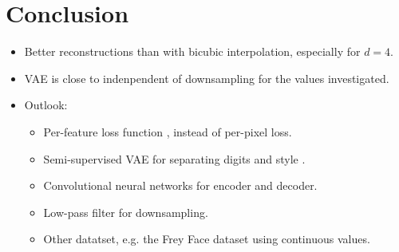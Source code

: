 \section{Conclusion} \label{sec:conclusion}

\begin{itemize}
	\item Better reconstructions than with bicubic interpolation, especially for $d = 4$.
	\item VAE is close to indenpendent of downsampling for the values investigated.
	\item Outlook:
	\begin{itemize}
		\item Per-feature loss function \cite{Johnson16}, instead of per-pixel loss.
		\item Semi-supervised VAE for separating digits and style \cite{Kingma2014}.
		\item Convolutional neural networks for encoder and decoder.
		\item Low-pass filter for downsampling.
		\item Other datatset, e.g. the Frey Face dataset \cite{Frey} using continuous values. 
	\end{itemize}
\end{itemize}
